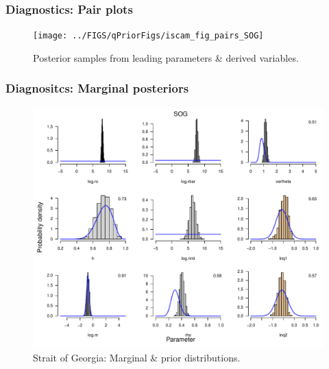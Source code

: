 %
\begin{frame}[t]\frametitle{Diagnostics: Pair plots}
	\begin{figure}[htbp]
		\centering
		\vspace{-1cm}	\texttt{[image: ../FIGS/qPriorFigs/iscam\_fig\_pairs\_SOG]}
		\vspace{-0.85cm}
		\caption{Posterior samples from leading parameters \& derived variables.}
	\end{figure}
\end{frame}
%
\begin{frame}[t]\frametitle{Diagnositcs: Marginal posteriors}
	\begin{figure}[htbp]
		\centering
			\includegraphics[scale=0.4]{../FIGS/qPriorFigs/iscam_fig_marginals_SOG}
		\caption{Strait of Georgia: Marginal \& prior distributions.}
	\end{figure}
\end{frame}

